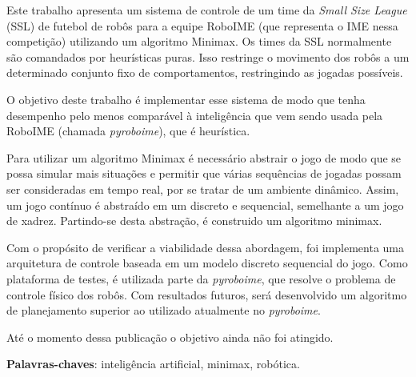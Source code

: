 \setlength{\absparsep}{18pt} %
\begin{resumo}

  Este trabalho apresenta um sistema de controle de um time da \textit{Small
  Size League} (SSL) de futebol de robôs para a equipe RoboIME (que representa o
  IME nessa competição) utilizando um algoritmo Minimax. Os times da SSL
  normalmente são comandados por heurísticas puras. Isso restringe o movimento
  dos robôs a um determinado conjunto fixo de comportamentos, restringindo as
  jogadas possíveis.

  O objetivo deste trabalho é implementar esse sistema de modo que tenha
  desempenho pelo menos comparável à inteligência que vem sendo usada pela
  RoboIME (chamada \textit{pyroboime}), que é heurística.

  Para utilizar um algoritmo Minimax é necessário abstrair o jogo de modo que se
  possa simular mais situações e permitir que várias sequências de jogadas
  possam ser consideradas em tempo real, por se tratar de um ambiente dinâmico.
  Assim, um jogo contínuo é abstraído em um discreto e sequencial,
  semelhante a um jogo de xadrez. Partindo-se desta abstração, é construido
  um algoritmo minimax.

  Com o propósito de verificar a viabilidade dessa abordagem, foi implementa uma
  arquitetura de controle baseada em um modelo discreto sequencial do jogo.
  Como plataforma de testes, é utilizada parte da \textit{pyroboime}, que
  resolve o problema de controle físico dos robôs. Com resultados futuros, será
  desenvolvido um algoritmo de planejamento superior ao utilizado atualmente no
  \textit{pyroboime}.

  Até o momento dessa publicação o objetivo ainda não foi atingido.

  \textbf{Palavras-chaves}: inteligência artificial, minimax, robótica.
\end{resumo}

